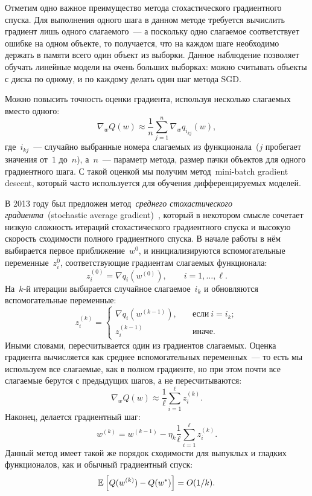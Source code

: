 \documentclass[12pt,fleqn]{article}
\begin{document}
Отметим одно важное преимущество метода стохастического градиентного спуска.
Для выполнения одного шага в данном методе требуется вычислить градиент лишь одного слагаемого~---
а поскольку одно слагаемое соответствует ошибке на одном объекте,
то получается, что на каждом шаге необходимо держать в памяти всего один объект из выборки.
Данное наблюдение позволяет обучать линейные модели на очень больших выборках:
можно считывать объекты с диска по одному, и по каждому делать один шаг метода SGD.

Можно повысить точность оценки градиента, используя несколько слагаемых вместо одного:
\[
    \nabla_w Q(w)
    \approx
    \frac{1}{n}
    \sum_{j = 1}^{n}
    \nabla_w q_{i_{kj}}(w),
\]
где~$i_{kj}$~--- случайно выбранные номера слагаемых из функционала~($j$ пробегает значения от~$1$ до~$n$),
а~$n$~--- параметр метода, размер пачки объектов для одного градиентного шага.
С такой оценкой мы получим метод~mini-batch gradient descent,
который часто используется для обучения дифференцируемых моделей.

В 2013 году был предложен метод~\emph{среднего стохастического градиента}~(stochastic average gradient)~\cite{schmidt13sag},
который в некотором смысле сочетает низкую сложность итераций стохастического градиентного спуска
и высокую скорость сходимости полного градиентного спуска.
В начале работы в нём выбирается первое приближение~$w^0$,
и инициализируются вспомогательные переменные~$z_i^0$,
соответствующие градиентам слагаемых функционала:
\[
    z_i^{(0)}
    =
    \nabla q_i(w^{(0)}),
    \qquad
    i = 1, \dots, \ell.
\]
На~$k$-й итерации выбирается случайное слагаемое~$i_k$ и
обновляются вспомогательные переменные:
\[
    z_i^{(k)}
    =
    \begin{cases}
        \nabla q_i(w^{(k - 1)}),
        \quad
        &\text{если}\ i = i_k;\\
        z_i^{(k - 1)}
        \quad
        &\text{иначе}.
    \end{cases}
\]
Иными словами, пересчитывается один из градиентов слагаемых.
Оценка градиента вычисляется как среднее вспомогательных переменных~---
то есть мы используем все слагаемые, как в полном градиенте,
но при этом почти все слагаемые берутся с предыдущих шагов, а не пересчитываются:
\[
    \nabla_w Q(w)
    \approx
    \frac{1}{\ell}
    \sum_{i = 1}^{\ell}
        z_i^{(k)}.
\]
Наконец, делается градиентный шаг:
\[
    w^{(k)}
    =
    w^{(k - 1)}
    -
    \eta_k
    \frac{1}{\ell}
    \sum_{i = 1}^{\ell}
    z_i^{(k)}.
\]
Данный метод имеет такой же порядок сходимости для выпуклых и гладких функционалов,
как и обычный градиентный спуск:
\[
    \mathbb{E} \left[
        Q(w^{(k)}) - Q(w^*)
    \right]
    =
    O(1 / k).
\]
\end{document}

